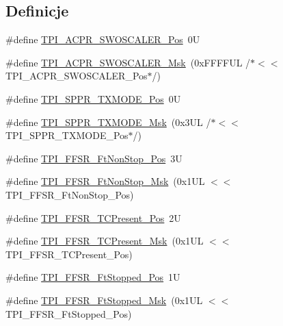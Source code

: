 \subsection*{Definicje}
\begin{DoxyCompactItemize}
\item 
\#define \hyperlink{group___c_m_s_i_s___t_p_i_ga73adc86f1ee60e5b75d963361535ed24}{T\+P\+I\+\_\+\+A\+C\+P\+R\+\_\+\+S\+W\+O\+S\+C\+A\+L\+E\+R\+\_\+\+Pos}~0U
\item 
\#define \hyperlink{group___c_m_s_i_s___t_p_i_ga73da1dbfb935b27bfd5473d3b041fdb5}{T\+P\+I\+\_\+\+A\+C\+P\+R\+\_\+\+S\+W\+O\+S\+C\+A\+L\+E\+R\+\_\+\+Msk}~(0x\+F\+F\+F\+F\+U\+L /$\ast$$<$$<$ T\+P\+I\+\_\+\+A\+C\+P\+R\+\_\+\+S\+W\+O\+S\+C\+A\+L\+E\+R\+\_\+\+Pos$\ast$/)
\item 
\#define \hyperlink{group___c_m_s_i_s___t_p_i_ga0f302797b94bb2da24052082ab630858}{T\+P\+I\+\_\+\+S\+P\+P\+R\+\_\+\+T\+X\+M\+O\+D\+E\+\_\+\+Pos}~0U
\item 
\#define \hyperlink{group___c_m_s_i_s___t_p_i_gaca085c8a954393d70dbd7240bb02cc1f}{T\+P\+I\+\_\+\+S\+P\+P\+R\+\_\+\+T\+X\+M\+O\+D\+E\+\_\+\+Msk}~(0x3\+U\+L /$\ast$$<$$<$ T\+P\+I\+\_\+\+S\+P\+P\+R\+\_\+\+T\+X\+M\+O\+D\+E\+\_\+\+Pos$\ast$/)
\item 
\#define \hyperlink{group___c_m_s_i_s___t_p_i_ga9537b8a660cc8803f57cbbee320b2fc8}{T\+P\+I\+\_\+\+F\+F\+S\+R\+\_\+\+Ft\+Non\+Stop\+\_\+\+Pos}~3U
\item 
\#define \hyperlink{group___c_m_s_i_s___t_p_i_gaaa313f980974a8cfc7dac68c4d805ab1}{T\+P\+I\+\_\+\+F\+F\+S\+R\+\_\+\+Ft\+Non\+Stop\+\_\+\+Msk}~(0x1\+U\+L $<$$<$ T\+P\+I\+\_\+\+F\+F\+S\+R\+\_\+\+Ft\+Non\+Stop\+\_\+\+Pos)
\item 
\#define \hyperlink{group___c_m_s_i_s___t_p_i_gad30fde0c058da2ffb2b0a213be7a1b5c}{T\+P\+I\+\_\+\+F\+F\+S\+R\+\_\+\+T\+C\+Present\+\_\+\+Pos}~2U
\item 
\#define \hyperlink{group___c_m_s_i_s___t_p_i_ga0d6bfd263ff2fdec72d6ec9415fb1135}{T\+P\+I\+\_\+\+F\+F\+S\+R\+\_\+\+T\+C\+Present\+\_\+\+Msk}~(0x1\+U\+L $<$$<$ T\+P\+I\+\_\+\+F\+F\+S\+R\+\_\+\+T\+C\+Present\+\_\+\+Pos)
\item 
\#define \hyperlink{group___c_m_s_i_s___t_p_i_gaedf31fd453a878021b542b644e2869d2}{T\+P\+I\+\_\+\+F\+F\+S\+R\+\_\+\+Ft\+Stopped\+\_\+\+Pos}~1U
\item 
\#define \hyperlink{group___c_m_s_i_s___t_p_i_ga1ab6c3abe1cf6311ee07e7c479ce5f78}{T\+P\+I\+\_\+\+F\+F\+S\+R\+\_\+\+Ft\+Stopped\+\_\+\+Msk}~(0x1\+U\+L $<$$<$ T\+P\+I\+\_\+\+F\+F\+S\+R\+\_\+\+Ft\+Stopped\+\_\+\+Pos)
$$
\end{DoxyCompactItemize}
